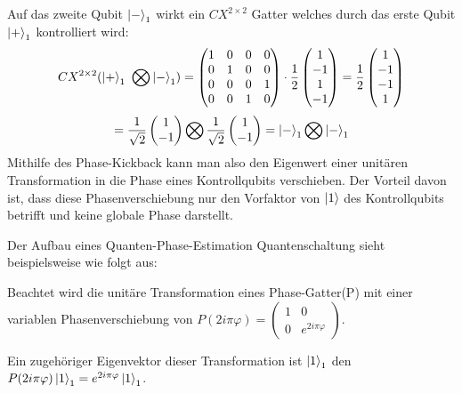 Auf das zweite Qubit \(\ket{-}_1\) wirkt ein \(CX^{2\times 2}\) Gatter welches durch das erste Qubit \(\ket{+}_1\) kontrolliert wird:
\[
  CX^{2\times 2}( \ket{+}_1\ \bigotimes \ket{-}_1) =
  \begin{pmatrix}
    1 & 0 & 0 & 0\\
    0 & 1 & 0 & 0\\
    0 & 0 & 0 & 1\\
    0 & 0 & 1 & 0
  \end{pmatrix}
  \cdot
  \frac{1}{{2}}
  \begin{pmatrix}
    1 \\
    -1 \\
    1 \\
    -1 
  \end{pmatrix}
  =
  \frac{1}{{2}}
  \begin{pmatrix}
    1 \\
    -1 \\
    -1 \\
    1 
  \end{pmatrix}
  \]
  \[
  =
  \frac{1}{{\sqrt{2}}}
  \begin{pmatrix}
    1 \\
    -1 
  \end{pmatrix}
  \bigotimes
  \frac{1}{{\sqrt{2}}}
  \begin{pmatrix}
    1 \\
    -1 
  \end{pmatrix}
  =
  \ket{-}_1 \bigotimes \ket{-}_1
  \]
Mithilfe des Phase-Kickback kann man also den Eigenwert einer unitären Transformation in die Phase eines Kontrollqubits verschieben.
Der Vorteil davon ist, dass diese Phasenverschiebung nur den Vorfaktor von \(\ket{1}\) des Kontrollqubits betrifft und keine globale Phase darstellt.

Der Aufbau eines Quanten-Phase-Estimation Quantenschaltung sieht beispielsweise wie folgt aus:

Beachtet wird die unitäre Transformation eines Phase-Gatter(P) mit einer variablen Phasenverschiebung von 
\(P(2 i \pi \varphi ) = 
\begin{pmatrix}
  1 & 0\\
  0 & e^{2 i \pi \varphi}
\end{pmatrix}\).

Ein zugehöriger Eigenvektor dieser Transformation ist \(\ket{1}_1\) den \(P(2 i \pi \varphi)\ket{1}_1 = e^{2 i \pi \varphi} \ket{1}_1\).

